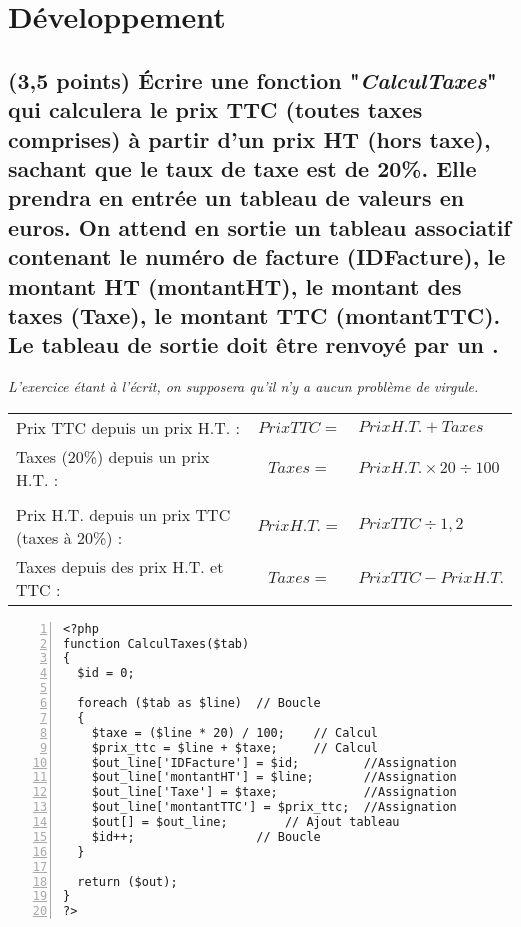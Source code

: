 \documentclass[11pt,a4paper]{article}
\begin{document}
\newpage

\section{Développement}

\subsection{(3,5 points) \'Ecrire une fonction "\textit{CalculTaxes}" qui calculera le prix TTC (toutes taxes comprises) à partir d'un prix HT (hors taxe), sachant que le taux de taxe est de 20\%. Elle prendra en entrée un tableau de valeurs en euros. On attend en sortie un tableau associatif contenant le numéro de facture (IDFacture), le montant HT (montantHT), le montant des taxes (Taxe), le montant TTC (montantTTC). Le tableau de sortie \text doit être renvoyé par un .}

\medskip

\textit{L'exercice étant à l'écrit, on supposera qu'il n'y a aucun problème de virgule.}

\medskip

\begin{tabular}{l c l}
Prix TTC depuis un prix H.T. : & $ Prix TTC = $ & $ Prix H.T. + Taxes $ \\
Taxes (20\%) depuis un prix H.T. : & $ Taxes = $ & $ Prix H.T. \times 20 \div 100 $ \\
 & & \\
Prix H.T. depuis un prix TTC (taxes à 20\%) : & $ Prix H.T. = $ & $ Prix TTC \div 1,2 $ \\
Taxes depuis des prix H.T. et TTC : & $ Taxes = $ & $ Prix TTC - Prix H.T. $ \\
\end{tabular}

\medskip

\lstset{language=php}
\begin{lstlisting}[frame=single,numbers=left]
<?php
function CalculTaxes($tab)
{
  $id = 0;

  foreach ($tab as $line)  // Boucle
  {
    $taxe = ($line * 20) / 100;    // Calcul
    $prix_ttc = $line + $taxe;     // Calcul
    $out_line['IDFacture'] = $id;         //Assignation
    $out_line['montantHT'] = $line;       //Assignation
    $out_line['Taxe'] = $taxe;            //Assignation
    $out_line['montantTTC'] = $prix_ttc;  //Assignation
    $out[] = $out_line;        // Ajout tableau
    $id++;                 // Boucle
  }

  return ($out);
}
?>
\end{lstlisting}
\end{document}
